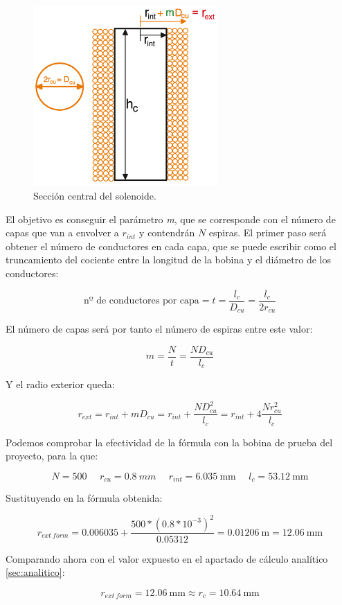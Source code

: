 \begin{figure}[H]
    \centering
    \includegraphics[width=7cm]{FigurasMemoria/esquemaBobinaREXT.png}
    \caption{Sección central del solenoide.}
    \label{fig:esquemaBobinaREXT} %
\end{figure}

El objetivo es conseguir el parámetro \textit{m}, que se corresponde con el número de capas que van a envolver a \(r_{int}\) y contendrán \(N\) espiras. El primer paso será obtener el número de conductores en cada capa, que se puede escribir como el truncamiento del cociente entre la longitud de la bobina y el diámetro de los conductores:

\[\text{nº~de~conductores~por~capa}=t=\frac{l_c}{D_{cu}}=\frac{l_c}{2r_{cu}}\]

El número de capas será por tanto el número de espiras entre este valor:

\[m=\frac{N}{t}=\frac{ND_{cu}}{l_c}\]

Y el radio exterior queda:

\[r_{ext}=r_{int}+mD_{cu}=r_{int}+\frac{ND_{cu}^2}{l_c}=r_{int}+4\frac{Nr_{cu}^2}{l_c}\]

Podemos comprobar la efectividad de la fórmula con la bobina de prueba del proyecto, para la que:

\[N=500~~~~~~r_{cu}=0.8~mm~~~~~~r_{int}=6.035~\text{mm}~~~~~~l_c=53.12~\text{mm}\]

Sustituyendo en la fórmula obtenida:

\[r_{ext~form}=0.006035+\frac{500*(0.8*10^{-3})^2}{0.05312}=0.01206~\text{m}=12.06~\text{mm}\]

Comparando ahora con el valor expuesto en el apartado de cálculo analítico \ref{sec:analitico}:

\[r_{ext~form}=12.06~\text{mm}\approx r_{c}=10.64~\text{mm}\]

